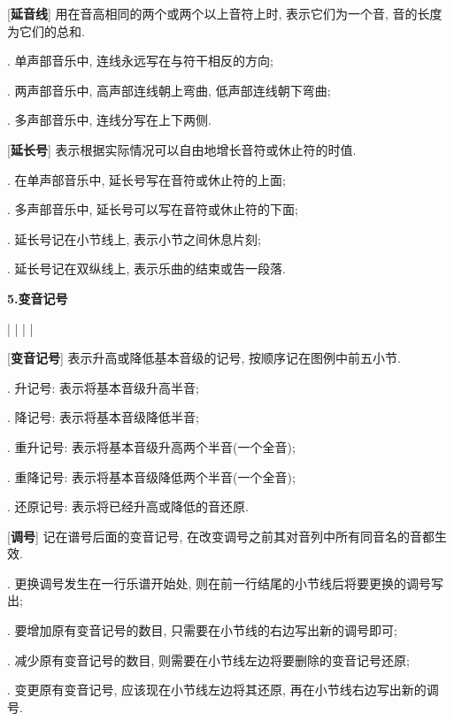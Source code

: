 [\textbf{延音线}] 用在音高相同的两个或两个以上音符上时, 表示它们为一个音, 音的长度为它们的总和.\par
{}. 单声部音乐中, 连线永远写在与符干相反的方向;\par
{}. 两声部音乐中, 高声部连线朝上弯曲, 低声部连线朝下弯曲;\par
{}. 多声部音乐中, 连线分写在上下两侧.\par

[\textbf{延长号}] 表示根据实际情况可以自由地增长音符或休止符的时值.\par
{}. 在单声部音乐中, 延长号写在音符或休止符的上面;\par
{}. 多声部音乐中, 延长号可以写在音符或休止符的下面;\par
{}. 延长号记在小节线上, 表示小节之间休息片刻;\par
{}. 延长号记在双纵线上, 表示乐曲的结束或告一段落.\par

\begin{center}
 \textbf{5.变音记号}\\
\end{center}

\treble
\startextract 
\Notes {}\en\bar
\Notes {}\en\bar
\Notes {}\en\bar
\Notes {}\en\bar
\Notes {}\en
\zendextract 

[\textbf{变音记号}] 表示升高或降低基本音级的记号, 按顺序记在图例中前五小节.\par
{}. 升记号: 表示将基本音级升高半音;\par
{}. 降记号: 表示将基本音级降低半音;\par
{}. 重升记号: 表示将基本音级升高两个半音(一个全音);\par
{}. 重降记号: 表示将基本音级降低两个半音(一个全音);\par
{}. 还原记号: 表示将已经升高或降低的音还原.\par

[\textbf{调号}] 记在谱号后面的变音记号, 在改变调号之前其对音列中所有同音名的音都生效.\par
{}. 更换调号发生在一行乐谱开始处, 则在前一行结尾的小节线后将要更换的调号写出;\par
{}. 要增加原有变音记号的数目, 只需要在小节线的右边写出新的调号即可;\par
{}. 减少原有变音记号的数目, 则需要在小节线左边将要删除的变音记号还原;\par
{}. 变更原有变音记号, 应该现在小节线左边将其还原, 再在小节线右边写出新的调号.\par


